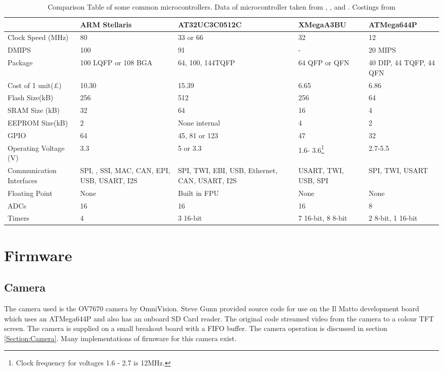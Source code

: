 \begin{table}
\centering
\begin{tabular}{|p{3.5cm}|p{2.4cm}|p{2.9cm}|p{2.3cm}|p{2.4cm}|}\hline
						& 	ARM Stellaris		&	AT32UC3C0512C 		&	XMegaA3BU	&	ATMega644P 	\\	\hline
Clock Speed	(MHz)		&	80					&	33 or 66			&	32			&	12			\\
DMIPS					&	100					&	91					&	-			&	20 MIPS		\\
Package					&	100 LQFP or 108 BGA	&	64, 100, 144TQFP	&	64 QFP or QFN & 40 DIP, 44 TQFP, 44 QFN \\
Cost of 1 unit(\pounds)	&	10.30				& 15.39 &	6.65	 & 6.86\\
Flash Size(kB)			&	256					&	512					&	256			&	64 \\
SRAM Size (kB)			&	32					&	64					&	16			&	4	\\
EEPROM Size(kB)			&	2					&	None internal		&	4			&	2 	\\
GPIO					&	64					& 	45, 81 or 123		&	47			& 	32	\\
Operating Voltage (V)	&	3.3					& 	5	or 3.3			& 	1.6- 3.6\footnote{Clock frequency for voltages 1.6 - 2.7 is 12MHz.}		& 	2.7-5.5	\\
Communication Interfaces &	SPI, \itc, SSI, MAC, CAN, EPI, USB, USART, I2S	& SPI, TWI, EBI, USB, Ethernet, CAN, USART, I2S	&	USART, TWI, USB, SPI 		&	SPI, TWI, USART \\
Floating Point			&	None				&	Built in FPU		&	None		&	None		\\
ADCs					&	16					&	16					&	16			&	8			\\
Timers					&	4					&	3 16-bit			& 7 16-bit, 8 8-bit & 2 8-bit, 1 16-bit \\
\hline
\end{tabular}
\caption{Comparison Table of some common microcontrollers. Data of microcontroller taken from \cite{Atmel:UC3C}, \cite{Atmel:644P}, \cite{Atmel:A3BU} and \cite{ARM:Stellaris}. Costings from \cite{Farnell}}
\label{tab:uCComp}
\end{table}

\section{Firmware}
\subsection{Camera}

The camera used is the OV7670 camera by OmniVision. Steve Gunn provided source code for use on the Il Matto development board which uses an ATMega644P and also has an onboard SD Card reader. The original code streamed video from the camera to a colour TFT screen. The camera is supplied on a small breakout board with a FIFO buffer. The camera operation is discussed in section \ref{Section:Camera}. Many implementations of firmware for this camera exist.

